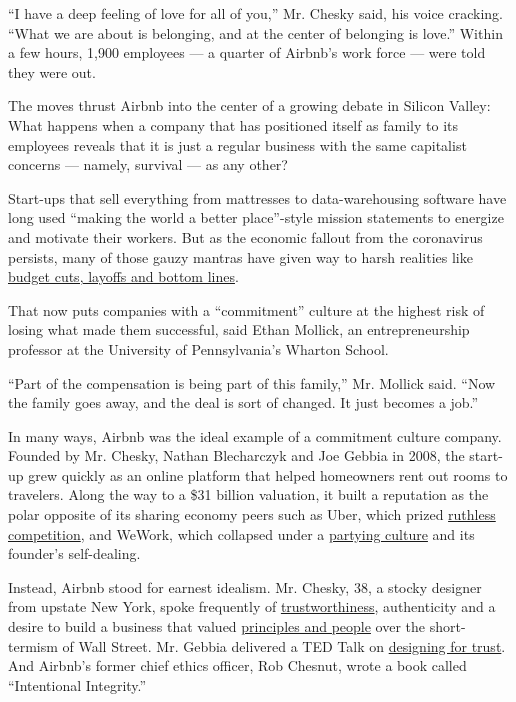 ``I have a deep feeling of love for all of you,'' Mr. Chesky said, his
voice cracking. ``What we are about is belonging, and at the center of
belonging is love.'' Within a few hours, 1,900 employees --- a quarter
of Airbnb's work force --- were told they were out.

The moves thrust Airbnb into the center of a growing debate in Silicon
Valley: What happens when a company that has positioned itself as family
to its employees reveals that it is just a regular business with the
same capitalist concerns --- namely, survival --- as any other?

Start-ups that sell everything from mattresses to data-warehousing
software have long used ``making the world a better place''-style
mission statements to energize and motivate their workers. But as the
economic fallout from the coronavirus persists, many of those gauzy
mantras have given way to harsh realities like
\href{https://www.nytimes.com/2020/04/01/technology/virus-start-ups-pummeled-layoffs-unwinding.html}{budget
cuts, layoffs and bottom lines}.

That now puts companies with a ``commitment'' culture at the highest
risk of losing what made them successful, said Ethan Mollick, an
entrepreneurship professor at the University of Pennsylvania's Wharton
School.

``Part of the compensation is being part of this family,'' Mr. Mollick
said. ``Now the family goes away, and the deal is sort of changed. It
just becomes a job.''

In many ways, Airbnb was the ideal example of a commitment culture
company. Founded by Mr. Chesky, Nathan Blecharczyk and Joe Gebbia in
2008, the start-up grew quickly as an online platform that helped
homeowners rent out rooms to travelers. Along the way to a \$31 billion
valuation, it built a reputation as the polar opposite of its sharing
economy peers such as Uber, which prized
\href{https://www.nytimes.com/2017/02/22/technology/uber-workplace-culture.html}{ruthless
competition}, and WeWork, which collapsed under a
\href{https://www.nytimes.com/2019/11/02/business/adam-neumann-wework-exit-package.html}{partying
culture} and its founder's self-dealing.

Instead, Airbnb stood for earnest idealism. Mr. Chesky, 38, a stocky
designer from upstate New York, spoke frequently of
\href{https://news.airbnb.com/in-the-business-of-trust/}{trustworthiness},
authenticity and a desire to build a business that valued
\href{https://news.airbnb.com/serving-all-stakeholders/}{principles and
people} over the short-termism of Wall Street. Mr. Gebbia delivered a
TED Talk on
\href{https://www.ted.com/talks/joe_gebbia_how_airbnb_designs_for_trust?language=en}{designing
for trust}. And Airbnb's former chief ethics officer, Rob Chesnut, wrote
a book called ``Intentional Integrity.''

